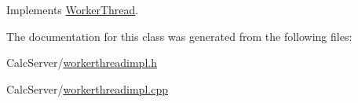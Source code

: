 Implements \hyperlink{classWorkerThread_a008dd6f762a2c20641afbb2a69319ca4}{Worker\+Thread}.



The documentation for this class was generated from the following files\+:\begin{DoxyCompactItemize}
\item 
Calc\+Server/\hyperlink{workerthreadimpl_8h}{workerthreadimpl.\+h}\item 
Calc\+Server/\hyperlink{workerthreadimpl_8cpp}{workerthreadimpl.\+cpp}\end{DoxyCompactItemize}
